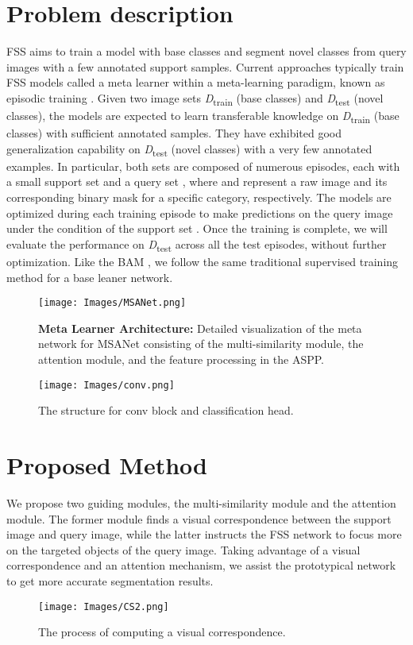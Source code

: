 \documentclass[10pt,twocolumn,letterpaper]{article}
\begin{document}
\section{Problem description}
FSS aims to train a model with base classes and segment novel classes from query images with a few annotated support samples. Current approaches typically train FSS models called a meta learner within a meta-learning paradigm, known as episodic training \cite{FSL3}. Given two image sets \textit{D}\textsubscript{train} (base classes) and \textit{D}\textsubscript{test} (novel classes), the models are expected to learn transferable knowledge on \textit{D}\textsubscript{train} (base classes) with sufficient annotated samples. They have exhibited good generalization capability on \textit{D}\textsubscript{test} (novel classes) with a very few annotated examples. In particular, both sets are composed of numerous episodes, each with a small support set  and a query set , where  and  represent a raw image and its corresponding binary mask for a specific category, respectively. The models are optimized during each training episode to make predictions on the query image  under the condition of the support set . Once the training is complete, we will evaluate the performance on \textit{D}\textsubscript{test} across all the test episodes, without further optimization. Like the BAM \cite{BAM}, we follow the same traditional supervised training method for a base leaner network. 
\begin{figure*}[ht]
\centering
\texttt{[image: Images/MSANet.png]}
\caption{ \textbf{Meta Learner Architecture: } Detailed visualization of the meta network for MSANet consisting of the multi-similarity module, the attention module, and the feature processing in the ASPP.}
\label{fig:second}
\end{figure*}

\begin{figure}[t]
\centering
\texttt{[image: Images/conv.png]}
\caption{The structure for conv block and classification head.}
\label{fig:convblock}
\end{figure}
\section{Proposed Method} 
We propose two guiding modules, the multi-similarity module and the attention module. The former module finds a visual correspondence between the support image and query image, while the latter instructs the FSS network to focus more on the targeted objects of the query image. Taking advantage of a visual correspondence and an attention mechanism, we assist the prototypical network to get more accurate segmentation results.
\begin{figure*}[t]
\centering
\texttt{[image: Images/CS2.png]}
\caption{The process of computing a visual correspondence.}
\label{fig:CS}
\end{figure*}
\end{document}
